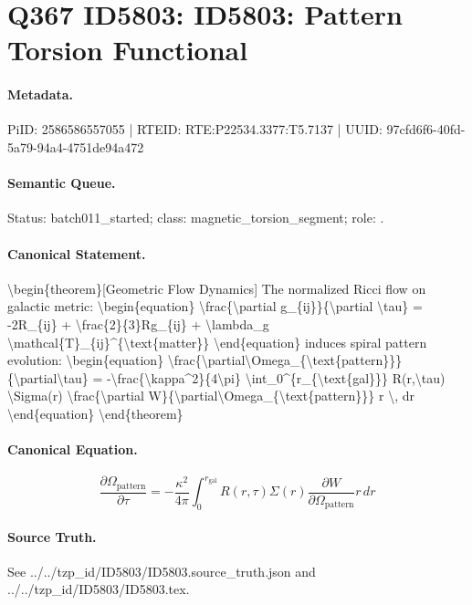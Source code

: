 \section*{Q367 ID5803: ID5803: Pattern Torsion Functional}
\paragraph{Metadata.}
PiID: 2586586557055 | RTEID: RTE:P22534.3377:T5.7137 | UUID: 97cfd6f6-40fd-5a79-94a4-4751de94a472

\paragraph{Semantic Queue.}
Status: batch011\_started; class: magnetic\_torsion\_segment; role: .

\paragraph{Canonical Statement.}
\textbackslash{}begin\{theorem\}[Geometric Flow Dynamics] The normalized Ricci flow on galactic metric: \textbackslash{}begin\{equation\} \textbackslash{}frac\{\textbackslash{}partial g\_\{ij\}\}\{\textbackslash{}partial \textbackslash{}tau\} = -2R\_\{ij\} + \textbackslash{}frac\{2\}\{3\}Rg\_\{ij\} + \textbackslash{}lambda\_g \textbackslash{}mathcal\{T\}\_\{ij\}\textasciicircum{}\{\textbackslash{}text\{matter\}\} \textbackslash{}end\{equation\} induces spiral pattern evolution: \textbackslash{}begin\{equation\} \textbackslash{}frac\{\textbackslash{}partial\textbackslash{}Omega\_\{\textbackslash{}text\{pattern\}\}\}\{\textbackslash{}partial\textbackslash{}tau\} = -\textbackslash{}frac\{\textbackslash{}kappa\textasciicircum{}2\}\{4\textbackslash{}pi\} \textbackslash{}int\_0\textasciicircum{}\{r\_\{\textbackslash{}text\{gal\}\}\} R(r,\textbackslash{}tau) \textbackslash{}Sigma(r) \textbackslash{}frac\{\textbackslash{}partial W\}\{\textbackslash{}partial\textbackslash{}Omega\_\{\textbackslash{}text\{pattern\}\}\} r \textbackslash{}, dr \textbackslash{}end\{equation\} \textbackslash{}end\{theorem\}

\paragraph{Canonical Equation.}
\[
\begin{equation} \frac{\partial\Omega_{\text{pattern}}}{\partial\tau} = -\frac{\kappa^2}{4\pi} \int_0^{r_{\text{gal}}} R(r,\tau) \Sigma(r) \frac{\partial W}{\partial\Omega_{\text{pattern}}} r \, dr \end{equation}
\]

\paragraph{Source Truth.}
See ../../tzp\_id/ID5803/ID5803.source\_truth.json and ../../tzp\_id/ID5803/ID5803.tex.
